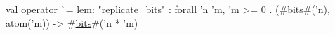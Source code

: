val operator ^^ = {lem: "replicate_bits"} : forall 'n 'm, 'm >= 0 . (#\hyperref[zbits]{bits}#('n), atom('m)) -> #\hyperref[zbits]{bits}#('n * 'm)
